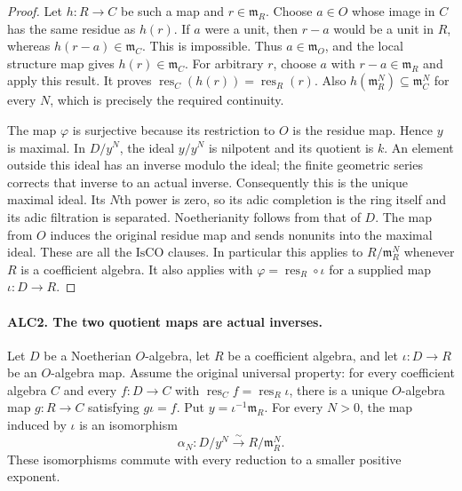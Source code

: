 \begin{proof}
Let \(h:R\to C\) be such a map and \(r\in\mathfrak m_R\).
Choose \(a\in O\) whose image in \(C\) has the same residue
as \(h(r)\).  If \(a\) were a unit, then \(r-a\) would be
a unit in \(R\), whereas \(h(r-a)\in\mathfrak m_C\).
This is impossible.  Thus \(a\in\mathfrak m_O\), and the
local structure map gives \(h(r)\in\mathfrak m_C\).
For arbitrary \(r\), choose \(a\) with \(r-a\in\mathfrak m_R\)
and apply this result.  It proves
\(\operatorname{res}_C(h(r))=\operatorname{res}_R(r)\).
Also \(h(\mathfrak m_R^N)\subseteq\mathfrak m_C^N\) for
every \(N\), which is precisely the required continuity.

The map \(\varphi\) is surjective because its restriction to
\(O\) is the residue map.  Hence \(y\) is maximal.  In
\(D/y^N\), the ideal \(y/y^N\) is nilpotent and its quotient
is \(k\).  An element outside this ideal has an inverse modulo
the ideal; the finite geometric series corrects that inverse to
an actual inverse.  Consequently this is the unique maximal ideal.
Its \(N\)th power is zero, so its adic completion is the ring
itself and its adic filtration is separated.  Noetherianity follows
from that of \(D\).  The map from \(O\) induces the original
residue map and sends nonunits into the maximal ideal.  These are
all the \(\mathrm{IsCO}\) clauses.  In particular this applies
to \(R/\mathfrak m_R^N\) whenever \(R\) is a coefficient
algebra.  It also applies with
\(\varphi=\operatorname{res}_R\circ\iota\) for a supplied
map \(\iota:D\to R\).
\end{proof}

\paragraph{ALC2. The two quotient maps are actual inverses.}
\label{claim:ALC2}
Let \(D\) be a Noetherian \(O\)-algebra, let \(R\) be a
coefficient algebra, and let \(\iota:D\to R\) be an
\(O\)-algebra map.  Assume the original universal property:
for every coefficient algebra \(C\) and every \(f:D\to C\)
with \(\operatorname{res}_C f=\operatorname{res}_R\iota\),
there is a unique \(O\)-algebra map \(g:R\to C\) satisfying
\(g\iota=f\).  Put \(y=\iota^{-1}\mathfrak m_R\).
For every \(N>0\), the map induced by \(\iota\) is an
isomorphism
\[
 \alpha_N:D/y^N\xrightarrow{\ \sim\ }R/\mathfrak m_R^N.
                                                        \tag{ALC.3}
\]
These isomorphisms commute with every reduction to a smaller
positive exponent.

